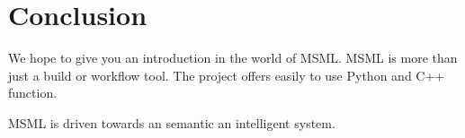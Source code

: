 \section{Conclusion}
\label{sec:conclusion}

We hope to give you an introduction in the world of MSML.
MSML is more than just a build or workflow tool. The project offers
easily to use Python and C++ function.

MSML is driven towards an semantic an intelligent system.



